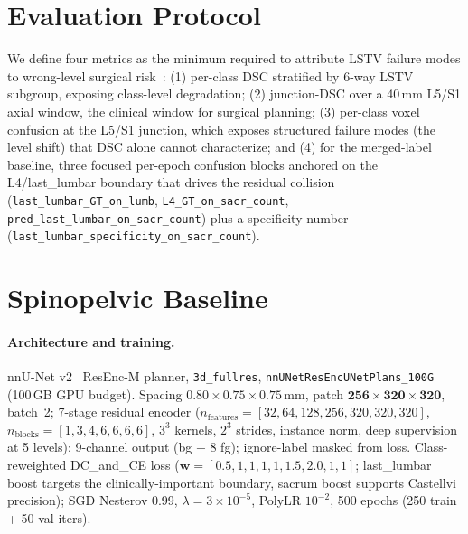 \documentclass{article}
\begin{document}
\section{Evaluation Protocol}
\label{sec:protocol}

We define four metrics as the minimum required to attribute
LSTV failure modes to wrong-level surgical
risk~\citep{Maier-Hein2024MetricsValidation}: (1) per-class
DSC stratified by 6-way LSTV subgroup, exposing class-level
degradation; (2) junction-DSC over a 40\,mm L5/S1 axial
window, the clinical window for surgical planning;
(3) per-class voxel confusion at the L5/S1 junction, which
exposes structured failure modes (the level shift) that
DSC alone cannot characterize; and (4) for the merged-label
baseline, three focused per-epoch confusion blocks anchored
on the L4/last\_lumbar boundary that drives the residual
collision (\texttt{last\_lumbar\_GT\_on\_lumb},
\texttt{L4\_GT\_on\_sacr\_count},
\texttt{pred\_last\_lumbar\_on\_sacr\_count}) plus a
specificity number
(\texttt{last\_lumbar\_specificity\_on\_sacr\_count}).

\section{Spinopelvic Baseline}
\label{sec:baseline}

\paragraph{Architecture and training.}
nnU-Net v2~\citep{Isensee2020NnU-Net:Segmentation,Isensee2024Nnu-netSegmentation}
ResEnc-M planner, \texttt{3d\_fullres},
\texttt{nnUNetResEncUNetPlans\_100G} (100\,GB GPU budget).
Spacing $0.80{\times}0.75{\times}0.75$\,mm, patch
$\mathbf{256{\times}320{\times}320}$, batch~2; 7-stage
residual encoder
($n_\text{features}{=}[32,64,128,256,320,320,320]$,
$n_\text{blocks}{=}[1,3,4,6,6,6,6]$, $3^3$ kernels, $2^3$
strides, instance norm, deep supervision at 5 levels);
9-channel output (bg + 8 fg); ignore-label masked from
loss. Class-reweighted DC\_and\_CE loss
($\mathbf{w}{=}[0.5,1,1,1,1,\mathbf{1.5},\mathbf{2.0},1,1]$;
last\_lumbar boost targets the clinically-important
boundary, sacrum boost supports Castellvi precision); SGD
Nesterov 0.99, $\lambda{=}3{\times}10^{-5}$, PolyLR
$10^{-2}$, 500 epochs (250 train + 50 val iters).
\end{document}
